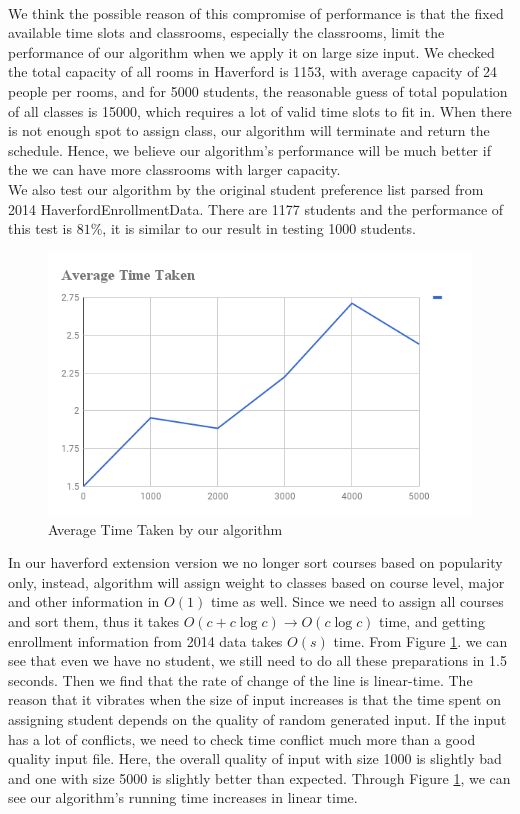 \documentclass[11pt, oneside]{article}   	%
\begin{document}
\\We think the possible reason of this compromise of performance is that the fixed available time slots and classrooms, especially the classrooms, limit the performance of our algorithm when we apply it on large size input. We checked the total capacity of all rooms in Haverford is 1153, with average capacity of 24 people per rooms, and for 5000 students, the reasonable guess of total population of all classes is 15000, which requires a lot of valid time slots to fit in. When there is not enough spot to assign class, our algorithm will terminate and return the schedule. Hence, we believe our algorithm's performance will be much better if the we can have more classrooms with larger capacity. 
\\We also test our algorithm by the original student preference list parsed from 2014 HaverfordEnrollmentData. There are 1177 students and the performance of this test is $81\%$, it is similar to our result in testing 1000 students. 
\begin{figure}[H]
\centering
\includegraphics[scale =.6]{chart}
\caption{Average Time Taken by our algorithm}
\label{timechart}
\end{figure}
In our haverford extension version we no longer sort courses based on popularity only, instead, algorithm will assign weight to classes based on course level, major and other information in $O(1)$ time as well. Since we need to assign all courses and sort them, thus it takes $O(c+c\log c) \to O(c\log c)$ time, and getting enrollment information from 2014 data takes $O(s)$ time. From Figure \ref{timechart}. we can see that even we have no student, we still need to do all these preparations in 1.5 seconds. Then we find that the rate of change of the line is linear-time. The reason that it vibrates when the size of input increases is that the time spent on assigning student depends on the quality of random generated input. If the input has a lot of conflicts,  we need to check time conflict much more than a good quality input file. Here, the overall quality of input with size 1000 is slightly bad and one with size 5000 is slightly better than expected. Through Figure \ref{timechart}, we can see our algorithm's running time increases in linear time.
\end{document}
